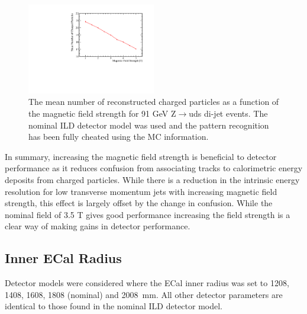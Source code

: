 \begin{figure}[h!]
\includegraphics[width=0.5\textwidth]{OptimisationStudies/Plots/Description/BField/BFieldNumbers_91GeV_Z_uds.pdf}
\caption[The mean number of reconstructed charged particles as a function of the magnetic field strength for 91 GeV Z$\rightarrow$uds di-jet events.  The nominal ILD detector model was used and the pattern recognition has been fully cheated using the MC information.]{The mean number of reconstructed charged particles as a function of the magnetic field strength for 91 GeV Z$\rightarrow$uds di-jet events.  The nominal ILD detector model was used and the pattern recognition has been fully cheated using the MC information.}
\label{fig:bfieldchargedparticles}
\end{figure}

In summary, increasing the magnetic field strength is beneficial to detector performance as it reduces confusion from associating tracks to calorimetric energy deposits from charged particles.  While there is a reduction in the intrinsic energy resolution for low transverse momentum jets with increasing magnetic field strength, this effect is largely offset by the change in confusion.  While the nominal field of 3.5 T gives good performance increasing the field strength is a clear way of making gains in detector performance.


\subsection{Inner ECal Radius}
Detector models were considered where the ECal inner radius was set to 1208, 1408, 1608, 1808 (nominal) and 2008~mm.  All other detector parameters are identical to those found in the nominal ILD detector model.

